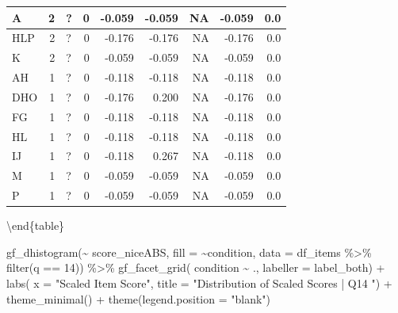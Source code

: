 \documentclass[
  letterpaper,
  DIV=11,
  numbers=noendperiod]{scrreprt}
\newenvironment{Shaded}{\begin{snugshade}}{\end{snugshade}}
\newcommand{\AttributeTok}[1]{\textcolor[rgb]{0.40,0.45,0.13}{#1}}
\newcommand{\DecValTok}[1]{\textcolor[rgb]{0.68,0.00,0.00}{#1}}
\newcommand{\FunctionTok}[1]{\textcolor[rgb]{0.28,0.35,0.67}{#1}}
\newcommand{\NormalTok}[1]{\textcolor[rgb]{0.00,0.23,0.31}{#1}}
\newcommand{\SpecialCharTok}[1]{\textcolor[rgb]{0.37,0.37,0.37}{#1}}
\newcommand{\StringTok}[1]{\textcolor[rgb]{0.13,0.47,0.30}{#1}}
\begin{document}
\begin{tabular}[t]{l|r|l|r|r|r|r|r|r}
\hline
\hspace{1em}A & 2 & ? & 0 & -0.059 & -0.059 & NA & -0.059 & 0.0\\
\hline
\hspace{1em}HLP & 2 & ? & 0 & -0.176 & -0.176 & NA & -0.176 & 0.0\\
\hline
\hspace{1em}K & 2 & ? & 0 & -0.059 & -0.059 & NA & -0.059 & 0.0\\
\hline
\hspace{1em}AH & 1 & ? & 0 & -0.118 & -0.118 & NA & -0.118 & 0.0\\
\hline
\hspace{1em}DHO & 1 & ? & 0 & -0.176 & 0.200 & NA & -0.176 & 0.0\\
\hline
\hspace{1em}FG & 1 & ? & 0 & -0.118 & -0.118 & NA & -0.118 & 0.0\\
\hline
\hspace{1em}HL & 1 & ? & 0 & -0.118 & -0.118 & NA & -0.118 & 0.0\\
\hline
\hspace{1em}IJ & 1 & ? & 0 & -0.118 & 0.267 & NA & -0.118 & 0.0\\
\hline
\hspace{1em}M & 1 & ? & 0 & -0.059 & -0.059 & NA & -0.059 & 0.0\\
\hline
\hspace{1em}P & 1 & ? & 0 & -0.059 & -0.059 & NA & -0.059 & 0.0\\
\hline
\end{tabular}

\textbackslash end\{table\}

\begin{Shaded}
\begin{Highlighting}[]
\FunctionTok{gf\_dhistogram}\NormalTok{(}\SpecialCharTok{\textasciitilde{}}\NormalTok{ score\_niceABS, }\AttributeTok{fill =} \SpecialCharTok{\textasciitilde{}}\NormalTok{condition, }\AttributeTok{data =}\NormalTok{ df\_items }\SpecialCharTok{\%\textgreater{}\%} \FunctionTok{filter}\NormalTok{(q }\SpecialCharTok{==} \DecValTok{14}\NormalTok{)) }\SpecialCharTok{\%\textgreater{}\%} 
  \FunctionTok{gf\_facet\_grid}\NormalTok{( condition }\SpecialCharTok{\textasciitilde{}}\NormalTok{ ., }\AttributeTok{labeller =}\NormalTok{ label\_both) }\SpecialCharTok{+} 
  \FunctionTok{labs}\NormalTok{( }\AttributeTok{x =} \StringTok{"Scaled Item Score"}\NormalTok{, }\AttributeTok{title =} \StringTok{"Distribution of Scaled Scores | Q14 "}\NormalTok{) }\SpecialCharTok{+} 
  \FunctionTok{theme\_minimal}\NormalTok{() }\SpecialCharTok{+} \FunctionTok{theme}\NormalTok{(}\AttributeTok{legend.position =} \StringTok{"blank"}\NormalTok{)}
\end{Highlighting}
\end{Shaded}
\end{document}
